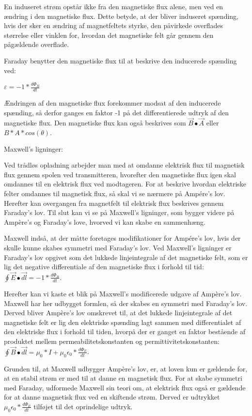 En induseret strøm opstår ikke fra den magnetiske flux alene, men ved en ændring i den magnetiske flux. Dette betyde, at der bliver induseret spænding, hvis der sker en ændring af magnetfeltets styrke, den påvirkede overflades størrelse eller vinklen for, hvordan det magnetiske felt går gennem den pågældende overflade.

Faraday benytter den magnetiske flux til at beskrive den inducerede spænding ved:

\centerline{$\varepsilon = -1 * \frac{d \Phi_B}{dt}$}

Ændringen af den magnetiske flux forekommer modsat af den inducerede spænding, så derfor ganges en faktor -1 på det differentierede udtryk af den magnetiske flux. Den magnetiske flux kan også beskrives som $\vec{B} \bullet \vec{A}$ eller $B * A * cos(\theta)$.

Maxwell's ligninger:

Ved trådløs opladning arbejder man med at omdanne elektrisk flux til magnetisk flux gennem spolen ved transmitteren, hvorefter den magnetiske flux igen skal omdannes til en elektrisk flux ved modtageren. For at beskrive hvordan elektriske felter omdannes til magnetisk flux, så skal vi se nærmere på Ampére's lov. Herefter kan overgangen fra magnetfelt til elektrisk flux beskrives gennem Faraday's lov. Til slut kan vi se på Maxwell's ligninger, som bygger videre på Ampère's og Faraday's love, hvorved vi kan skabe en sammenhæng.

Maxwell indså, at der måtte foretages modifikationer for Ampére's lov, hvis der skulle kunne skabes symmetri med Faraday's lov. Ved Maxwell's ligninger er Faraday's lov opgivet som det lukkede linjeintegrale af det magnetiske felt, som er lig det negative differentiale af den magnetiske flux i forhold til tid: $\oint \vec{E} \bullet \vec{dl} = -1 * \frac{d \Phi_B}{dt}$.

Herefter kan vi kaste et blik på Maxwell's modificerede udgave af Ampère's lov. Maxwell har her udbygget formlen, så der skabes en symmetri med Faraday's lov. Derved bliver Ampère's lov omskrevet til, at det lukkede linjeintegrale af det magnetiske felt er lig den elektriske spænding lagt sammen med differentialet af den elektriske flux i forhold til tiden, hvorpå der er ganget en faktor bestående af produktet mellem permeabilitetskonstanten og permittivitetskonstanten: $\oint \vec{B} \bullet \vec{dl} = \mu_0 * I + \mu_0 \epsilon_0 * \frac{d \Phi_E}{dt}$.

Grunden til, at Maxwell udbygger Ampère's lov, er, at loven kun er gældende for, at en stabil strøm er med til at danne en magnetisk flux. For at skabe symmetri med Faraday, udformede Maxwell sin teori om, at elektrisk flux også er gældende for at danne magnetisk flux ved en skiftende strøm. Derved er udtrykket $\mu_0 \epsilon_0 * \frac{d \Phi_E}{dt}$ tilføjet til det oprindelige udtryk.

